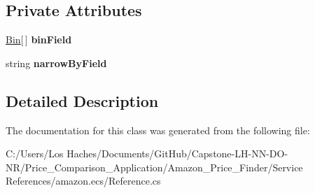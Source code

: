 \subsection*{Private Attributes}
\begin{DoxyCompactItemize}
\item 
\hypertarget{class_price___comparison_1_1amazon_1_1ecs_1_1_search_bin_set_a3d2396cfa0a7b904400b8a0de5cc3bc7}{\hyperlink{class_price___comparison_1_1amazon_1_1ecs_1_1_bin}{Bin}\mbox{[}$\,$\mbox{]} {\bfseries bin\-Field}}\label{class_price___comparison_1_1amazon_1_1ecs_1_1_search_bin_set_a3d2396cfa0a7b904400b8a0de5cc3bc7}

\item 
\hypertarget{class_price___comparison_1_1amazon_1_1ecs_1_1_search_bin_set_aeba95e29462e84dc97a359c2cc99b0f4}{string {\bfseries narrow\-By\-Field}}\label{class_price___comparison_1_1amazon_1_1ecs_1_1_search_bin_set_aeba95e29462e84dc97a359c2cc99b0f4}

\end{DoxyCompactItemize}


\subsection{Detailed Description}


The documentation for this class was generated from the following file\-:\begin{DoxyCompactItemize}
\item 
C\-:/\-Users/\-Los Haches/\-Documents/\-Git\-Hub/\-Capstone-\/\-L\-H-\/\-N\-N-\/\-D\-O-\/\-N\-R/\-Price\-\_\-\-Comparison\-\_\-\-Application/\-Amazon\-\_\-\-Price\-\_\-\-Finder/\-Service References/amazon.\-ecs/Reference.\-cs\end{DoxyCompactItemize}
